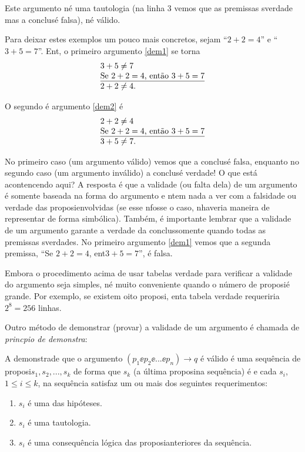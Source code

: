 Este argumento n\ao \'e uma tautologia (na linha 3 vemos que as premissas s\ao verdade mas a conclus\ao \'e falsa), n\ao \'e v\'alido.

Para deixar estes exemplos um pouco mais concretos, sejam \pp ``$2+2=4$'' e \qq ``$3+5=7$''. Ent\aoi, o primeiro argumento \ref{dem1} se torna 
\begin{eqnarray*}
\begin{tabular}{l}
$3+5\neq 7$ \\
\underline{Se $2+2=4$, ent\ao $3+5=7$} \\
$2+2\neq 4$.
\end{tabular}
\end{eqnarray*}

O segundo \'e argumento \ref{dem2} \'e
\begin{eqnarray*}
\begin{tabular}{l}
$2+2\neq 4$ \\
\underline{Se $2+2=4$, ent\ao $3+5=7$} \\
$3+5\neq 7$.
\end{tabular}
\end{eqnarray*}


No primeiro caso (um argumento v\'alido) vemos que a conclus\ao \'e falsa, enquanto no segundo caso (um argumento inv\'alido) a conclus\ao \'e verdade! O que est\'a acontencendo aqui? A resposta \'e que a validade (ou falta dela) de um argumento \'e somente baseada na forma do argumento e n\ao tem nada a ver com a falsidade ou verdade das proposi\coes envolvidas (se esse n\ao fosse o caso, n\ao haveria maneira de representar de forma simb\'olica). Tamb\'em, \'e importante lembrar que a validade de um argumento garante a verdade da conclus\ao somente quando todas as premissas s\ao verdades. No primeiro argumento \ref{dem1} vemos que a segunda premissa, ``Se $2+2=4$, ent\ao $3+5=7$'', \'e falsa.

Embora o procedimento acima de usar tabelas verdade para verificar a validade do argumento seja simples, n\ao \'e muito conveniente quando o n\'umero de proposi\coes \'e grande. Por exemplo, se existem oito proposi\cois, ent\ao a tabela verdade requeriria $2^8=256$ linhas.   

Outro m\'etodo de demonstrar (provar) a validade de um argumento \'e chamada de {\it princ\ih pio de demonstra\cao}:

A demonstra\cao de que o argumento $(p_1\ee p_2\ee ...\ee p_n)\to q$ \'e v\'alido \'e uma sequ\^encia de proposi\coes $s_1,s_2,...,s_k$ de forma que $s_k$ (a \'ultima proposi\cao na sequ\^encia) \'e \qq e cada $s_i$, $1\leq i \leq k$, na sequ\^encia satisfaz um ou mais dos seguintes requerimentos:  
\begin{enumerate}[{\bf a)}]
\item $s_i$ \'e uma das hip\'oteses.
\item $s_i$ \'e uma tautologia.
\item $s_i$ \'e uma consequ\^encia l\'ogica das proposi\coes anteriores da sequ\^encia.
\end{enumerate}

